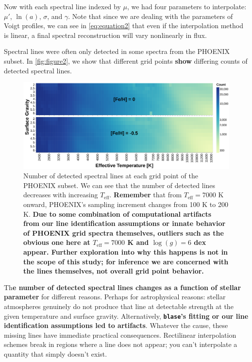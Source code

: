 \documentclass[twocolumn, linenumbers]{aastex631}
\begin{document}
Now with each spectral line indexed by $\mu$, we had four parameters to interpolate: $\mu'$, $\ln(a)$, $\sigma$, and $\gamma$.
Note that since we are dealing with the parameters of Voigt profiles, we can see in \autoref{eq:equation2} that even if the interpolation method is linear, a final spectral reconstruction will vary nonlinearly in flux.

Spectral lines were often only detected in some spectra from the PHOENIX subset.
In \autoref{fig:figure2}, we show that different grid points \textbf{show} differing counts of detected spectral lines.

\begin{figure}
    \centering
    \includegraphics[width=\textwidth]{figure2}
    \caption{Number of detected spectral lines at each grid point of the PHOENIX subset.
    We can see that the number of detected lines decreases with increasing $T_{\mathrm{eff}}$.
    \textbf{Remember} that from $T_{\mathrm{eff}} = 7000$ K onward, PHOENIX's sampling increment changes from 100 K to 200 K.
    \textbf{Due to some combination of computational artifacts from our line identification assumptions or innate behavior of PHOENIX grid spectra themselves, outliers such as the obvious one here at $T_{\mathrm{eff}} = 7000$ K and $\log(g) = 6$ dex appear.
    Further exploration into why this happens is not in the scope of this study; for inference we are concerned with the lines themselves, not overall grid point behavior.}}
    \label{fig:figure2}
\end{figure}

Th\textbf{e number of detected spectral lines changes as a function of stellar parameter} for different reasons.
Perhaps for astrophysical reasons: stellar atmospheres genuinely do not produce that line at detectable strength at the given temperature and surface gravity.
Alternatively, \textbf{\texttt{blase}'s fitting or our line identification assumptions led to artifacts}.
Whatever the cause, these missing lines have immediate practical consequences.
Rectilinear interpolation schemes break in regions where a line does not appear; you can't interpolate a quantity that simply doesn't exist.
\end{document}
